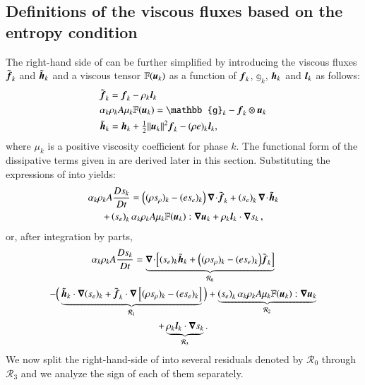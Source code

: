 \subsection{Definitions of the viscous fluxes based on the entropy condition}
%
The right-hand side of  can be further simplified by introducing the viscous fluxes $\tilde{\boldsymbol f}_k$ and 
$\tilde{\boldsymbol h}_k$ and a viscous tensor $\mathbb{F}(\boldsymbol u_k)$ as a function of $\boldsymbol f_k$, 
$\mathbb{g}_k$, $\boldsymbol h_k$ and $\boldsymbol l_k$ as follows:
%
\begin{subequations}\label{eq:def-diss-terms-sect4}
\begin{align}
& \tilde{\mbold f}_k   =   \mbold f_k - \rho_k \mbold  l_k
  \\
&  \alpha_k \rho_k A \mu_k \mathbb{F}(\mbold u_k) =  \mathbb{g}_k -  \mbold f_k \otimes \mbold u_k
  \\
&  \tilde{\mbold h}_k =   \mbold h_k + \tfrac{1}{2}\| \mbold u_k\|^2  \mbold f_k - (\rho e)_k \mbold l_k,
\end{align}
\end{subequations}
%
where $\mu_k$ is a positive viscosity coefficient for phase $k$. The functional form of the dissipative terms given in 
 are derived later in this section. Substituting the expressions of  
into  yields:
%
\begin{multline}\label{eq:ent-res-7-eqn-diss-terms_rearranged2}
\alpha_k \rho_k A \frac{Ds_k}{Dt} 
=  \left( (\rho s_\rho)_k - (e s_e)_k \right) \boldsymbol\nabla\! \cdot \! \tilde{\boldsymbol f}_k 
+ \left(s_e\right)_k \boldsymbol\nabla\! \cdot \! \tilde{ \boldsymbol h} _k \\
+ \left(s_e\right)_k \alpha_k \rho_k A \mu_k \mathbb{F}(\boldsymbol u_k) : \boldsymbol\nabla \boldsymbol u_k 
+ \rho_k \boldsymbol l _k \cdot \boldsymbol\nabla s_k \,,
\end{multline}
%
or, after integration by parts,
%
\begin{multline}\label{eq:ent-res-7-eqn-diss-terms2}
\alpha_k \rho_k A \frac{Ds_k}{Dt} = 
\underbrace{\boldsymbol\nabla\! \cdot \! \left[ (s_e)_k\tilde{\boldsymbol h}_k +\Big( (\rho s_\rho)_k - (e s_e)_k \Big) \tilde{\boldsymbol f}_k \right]}_{{\mathcal{R}_0}} \\
-\Big(
\underbrace{\tilde{\boldsymbol h}_k \cdot \boldsymbol\nabla (s_e)_k + \tilde{\boldsymbol f}_k \cdot \boldsymbol\nabla \left[  (\rho s_\rho)_k - (e s_e)_k \right]}_{\mathcal{R}_1} 
\Big)
+ \underbrace{ \left(s_e\right)_k \alpha_k \rho_k A \mu_k \mathbb{F}(\boldsymbol u_k) : \boldsymbol\nabla \boldsymbol u_k}_{\mathcal{R}_2} \\
+ \underbrace{\rho_k \boldsymbol l _k \cdot \boldsymbol\nabla s_k}_{\mathcal{R}_3}.
\end{multline}
%
We now split the right-hand-side of  into several residuals denoted by $\mathcal{R}_0$ 
through $\mathcal{R}_3$ and we analyze the sign of each of them separately. 

